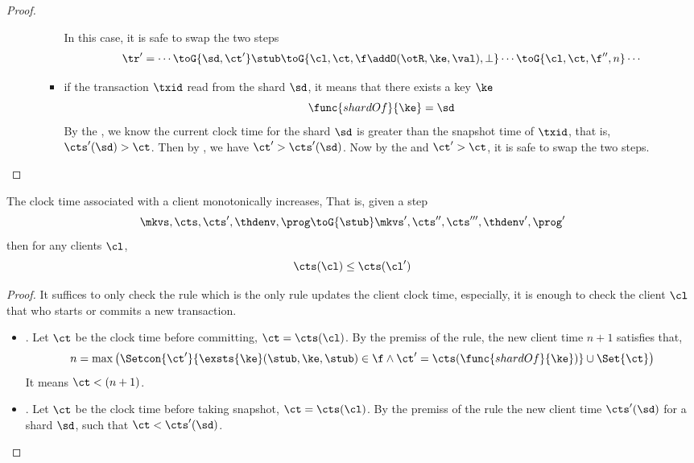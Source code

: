 \begin{proof}
\begin{itemize}
\begin{itemize}
\begin{itemize}
\[                \]
            In this case, it is safe to swap the two steps
            \[
            \begin{array}{@{}l@{}}
            \tr' = \cdots \toG{\sd, \ct'} \stub \toG{\cl,\ct,\f \addO (\otR, \ke, \val),\perp} \cdots \toG{\cl,\ct,\f'',n} \cdots \\
            \end{array}
            \]
            \item if the transaction \( \txid \) read from the shard \( \sd \), it means that there exists a key \( \ke \)
            \[
                \func{shardOf}{\ke} = \sd
            \]
            By the , we know the current clock time for the shard \( \sd \) is greater than the snapshot time of \( \txid \), 
            that is, \( \cts'(\sd) > \ct \).
            Then by ,  we have \( \ct' > \cts'(\sd) \).
            Now by the  and \( \ct' > \ct \), it is safe to swap the two steps.
        \end{itemize}
    \end{itemize}
    \end{itemize}
\end{proof}

\begin{lemma}
    \label{lem:mono-client-clock-time}
    The clock time associated with a client monotonically increases,
    That is, given a step
    \[
        \mkvs, \cts, \cts', \thdenv, \prog \toG{\stub} \mkvs', \cts'', \cts''', \thdenv', \prog'
    \]
    then for any clients \( \cl \),
    \[
        \cts(\cl) \leq \cts(\cl')
    \]
\end{lemma}
\begin{proof}
    It suffices to only check the  rule which is the only rule updates the client clock time,
    especially, it is enough to check the client \( \cl \) that who starts or commits a new transaction.
    \begin{itemize}
        \item {}.
            Let \( \ct \) be the clock time before committing, \( \ct = \cts(\cl)\).
            By the premiss of the rule, the new client time \( n + 1 \) satisfies that, 
            \[
                n = \max\left( \Setcon{\ct'}{\exsts{\ke} (\stub, \ke, \stub) \in \f \land \ct' = \cts(\func{shardOf}{\ke})} \cup \Set{\ct} \right)
            \]
            It means \( \ct < (n + 1)\).
        \item {}.
            Let \( \ct \) be the clock time before taking snapshot, \( \ct = \cts(\cl)\).
            By the premiss of the rule the new  client time \( \cts'(\sd) \) for a shard \( \sd \), 
            such that \( \ct < \cts'(\sd)  \).
    \end{itemize}
\end{proof}

